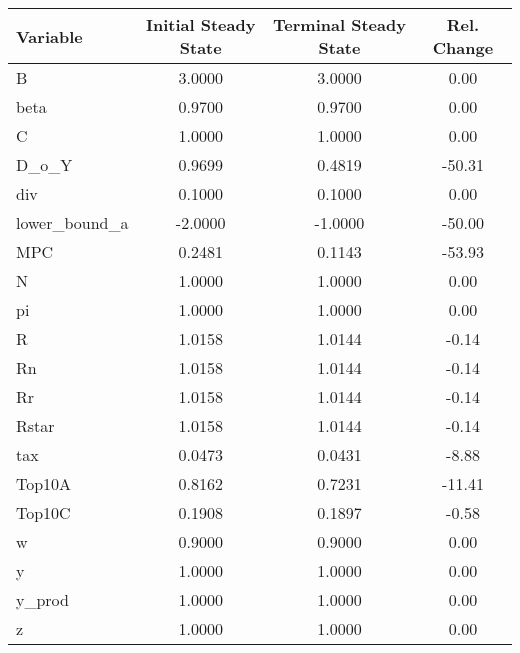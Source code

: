 \documentclass[12pt]{article} %
\numberwithin{equation}{section} %
\begin{document}
\begin{center}
\begin{tabular}{lccc}
     Variable &  Initial Steady State &  Terminal Steady State &  Rel. Change \\
     \hline
            B &                3.0000 &                 3.0000 &         0.00 \\
         beta &                0.9700 &                 0.9700 &         0.00 \\
            C &                1.0000 &                 1.0000 &         0.00 \\
        D\_o\_Y &                0.9699 &                 0.4819 &       -50.31 \\
          div &                0.1000 &                 0.1000 &         0.00 \\
lower\_bound\_a &               -2.0000 &                -1.0000 &       -50.00 \\
          MPC &                0.2481 &                 0.1143 &       -53.93 \\
            N &                1.0000 &                 1.0000 &         0.00 \\
           pi &                1.0000 &                 1.0000 &         0.00 \\
            R &                1.0158 &                 1.0144 &        -0.14 \\
           Rn &                1.0158 &                 1.0144 &        -0.14 \\
           Rr &                1.0158 &                 1.0144 &        -0.14 \\
        Rstar &                1.0158 &                 1.0144 &        -0.14 \\
          tax &                0.0473 &                 0.0431 &        -8.88 \\
       Top10A &                0.8162 &                 0.7231 &       -11.41 \\
       Top10C &                0.1908 &                 0.1897 &        -0.58 \\
            w &                0.9000 &                 0.9000 &         0.00 \\
            y &                1.0000 &                 1.0000 &         0.00 \\
       y\_prod &                1.0000 &                 1.0000 &         0.00 \\
            z &                1.0000 &                 1.0000 &         0.00 \\
\end{tabular}
\end{center}
\end{document}
